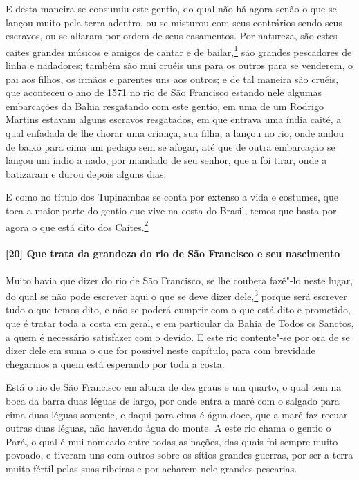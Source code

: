 E desta maneira se consumiu este gentio, do qual não há agora senão o que se lançou muito
pela terra adentro, ou se misturou com seus contrários sendo seus escravos, ou se aliaram
por ordem de seus casamentos. Por natureza, são estes caites grandes músicos e amigos de
cantar e de bailar,\footnote{ Em Varnhagen (1851 e 1879), ``grandes músicos e amigos de
bailar''.} são grandes pescadores de linha e nadadores; também são mui cruéis uns para os
outros para se venderem, o pai aos filhos, os irmãos e parentes uns aos outros; e de tal
maneira são cruéis, que aconteceu o ano de 1571 no rio de São Francisco estando nele
algumas embarcações da Bahia resgatando com este gentio, em uma de um Rodrigo Martins
estavam alguns escravos resgatados, em que entrava uma índia caité, a qual enfadada de lhe
chorar uma criança, sua filha, a lançou no rio, onde andou de baixo para cima um pedaço
sem se afogar, até que de outra embarcação se lançou um índio a nado, por mandado de seu
senhor, que a foi tirar, onde a batizaram e durou depois alguns dias.

E como no título dos Tupinambas se conta por extenso a vida e costumes, que toca a maior
parte do gentio que vive na costa do Brasil, temos que basta por agora o que está dito dos
Caites.\footnote{ Em Varnhagen (1851 e 1879), ``basta o que está dito até agora dos
\textit{Caités}''.}

\paragraph{[20] Que trata da grandeza do rio de São Francisco e seu nascimento} \quad
Muito havia que dizer do rio de São Francisco, se lhe coubera fazê"-lo neste lugar, do qual
se não pode escrever aqui o que se deve dizer dele,\footnote{ No manuscrito da
\textsc{bgjm}, ``o que se pode dizer dele''.} porque será escrever tudo o que temos dito,
e não se poderá cumprir com o que está dito e prometido, que é tratar toda a costa em
geral, e em particular da Bahia de Todos os Sanctos, a quem é necessário satisfazer com o
devido. E este rio contente"-se por ora de se dizer dele em suma o que for possível neste
capítulo, para com brevidade chegarmos a quem está esperando por toda a costa.

Está o rio de São Francisco em altura de dez graus e um quarto, o qual tem na boca da
barra duas léguas de largo, por onde entra a maré com o salgado para cima duas léguas
somente, e daqui para cima é água doce, que a maré faz recuar outras duas léguas, não
havendo água do monte. A este rio chama o gentio o Pará, o qual é mui nomeado entre todas
as nações, das quais foi sempre muito povoado, e tiveram uns com outros sobre os sítios
grandes guerras, por ser a terra muito fértil pelas suas ribeiras e por acharem nele
grandes pescarias.

